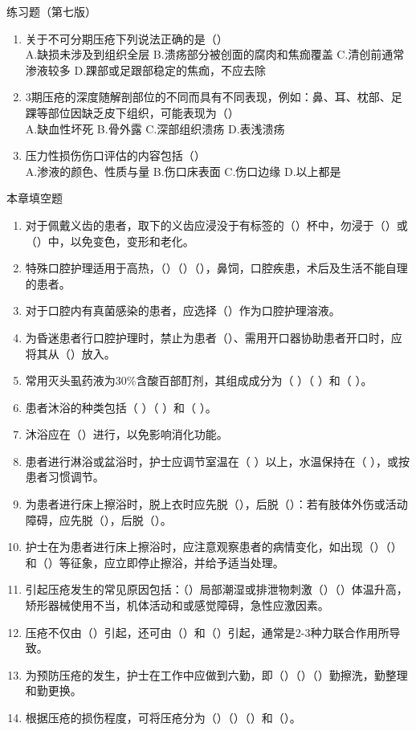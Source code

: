 \documentclass[11pt, a4paper]{ctexart}
\begin{document}
\begin{examplebox}{练习题（第七版）}
\begin{enumerate}
		      A.粉红色创面 \quad B.局限性红斑 \quad C.皮下脂肪外露 \quad D.肌腱外露
		\item 关于不可分期压疮下列说法正确的是（\qquad）\\
		      A.缺损未涉及到组织全层 \quad B.溃疡部分被创面的腐肉和焦痂覆盖 \quad C.清创前通常渗液较多 \quad D.踝部或足跟部稳定的焦痂，不应去除
		\item 3期压疮的深度随解剖部位的不同而具有不同表现，例如：鼻、耳、枕部、足踝等部位因缺乏皮下组织，可能表现为（\qquad）\\
		      A.缺血性坏死 \quad B.骨外露 \quad C.深部组织溃疡 \quad D.表浅溃疡
		\item 压力性损伤伤口评估的内容包括（\qquad）\\
		      A.渗液的颜色、性质与量 \quad B.伤口床表面 \quad C.伤口边缘 \quad D.以上都是
	\end{enumerate}
\end{examplebox}

\begin{tipsbox}{本章填空题}
	\begin{enumerate}
		\item 对于佩戴义齿的患者，取下的义齿应浸没于有标签的（\qquad）杯中，勿浸于（\qquad）或（\qquad）中，以免变色，变形和老化。
		\item 特殊口腔护理适用于高热，（\qquad）（\qquad）（\qquad），鼻饲，口腔疾患，术后及生活不能自理的患者。
		\item 对于口腔内有真菌感染的患者，应选择（\qquad）作为口腔护理溶液。
		\item 为昏迷患者行口腔护理时，禁止为患者（\qquad）、需用开口器协助患者开口时，应将其从（\qquad）放入。
		\item 常用灭头虱药液为30\%含酸百部酊剂，其组成成分为（     ）（      ）和（      ）。
		\item 患者沐浴的种类包括（   ）（   ）和（   ）。
		\item 沐浴应在（\qquad）进行，以免影响消化功能。
		\item 患者进行淋浴或盆浴时，护士应调节室温在（   ）以上，水温保持在（   ），或按患者习惯调节。
		\item 为患者进行床上擦浴时，脱上衣时应先脱（\qquad），后脱（\qquad）：若有肢体外伤或活动障碍，应先脱（\qquad），后脱（\qquad）。
		\item 护士在为患者进行床上擦浴时，应注意观察患者的病情变化，如出现（\qquad）（\qquad）和（\qquad）等征象，应立即停止擦浴，并给予适当处理。
		\item 引起压疮发生的常见原因包括：（\qquad）局部潮湿或排泄物刺激（\qquad）（\qquad）体温升高，矫形器械使用不当，机体活动和或感觉障碍，急性应激因素。
		\item 压疮不仅由（\qquad）引起，还可由（\qquad）和（\qquad）引起，通常是2-3种力联合作用所导致。
		\item 为预防压疮的发生，护士在工作中应做到六勤，即（\qquad）（\qquad）（\qquad）勤擦洗，勤整理和勤更换。
		\item 根据压疮的损伤程度，可将压疮分为（\qquad）（\qquad）（\qquad）和（\qquad）。
	\end{enumerate}
\end{tipsbox}
\end{document}
